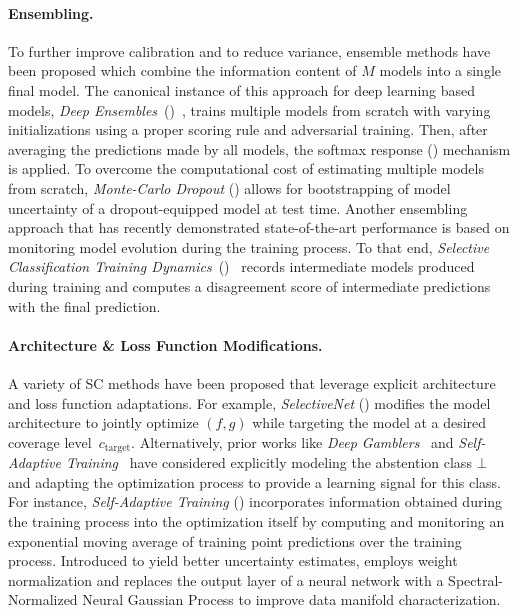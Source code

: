 \paragraph{Ensembling.} %
To further improve calibration and to reduce variance, ensemble methods have been proposed which combine the information content of $M$ models into a single final model. The canonical instance of this approach for deep learning based models, \emph{Deep Ensembles}~(\de)~\citep{lakshminarayanan2017simple}, trains multiple models from scratch with varying initializations using a proper scoring rule and adversarial training. Then, after averaging the predictions made by all models, the softmax response (\sr) mechanism is applied. To overcome the computational cost of estimating multiple models from scratch, \emph{Monte-Carlo Dropout} (\mcdo) \citep{gal2016dropout} allows for bootstrapping of model uncertainty of a dropout-equipped model at test time. Another ensembling approach that has recently demonstrated state-of-the-art \selc performance is based on monitoring model evolution during the training process. To that end, \emph{Selective Classification Training Dynamics}~(\sctd)~\citep{rabanser2022selective} records intermediate models produced during training and computes a disagreement score of intermediate predictions with the final prediction. 


\paragraph{Architecture \& Loss Function Modifications.} 
A variety of SC methods have been proposed that leverage explicit architecture and loss function adaptations. %
For example, \emph{SelectiveNet} (\sn) \citep{geifman2019selectivenet} modifies the model architecture to jointly optimize $(f,g)$ while targeting the model at a desired coverage level~$c_\text{target}$. Alternatively, prior works like \emph{Deep Gamblers}~\citep{liu2019deep} and \emph{Self-Adaptive Training}~\citep{huang2020self} have considered explicitly modeling the abstention class $\bot$ and adapting the optimization process to provide a learning signal for this class. For instance, \emph{Self-Adaptive Training} (\sat) incorporates information obtained during the training process into the optimization itself by computing and monitoring an exponential moving average of training point predictions over the training process. Introduced to yield better uncertainty estimates, \citet{liu2020simple} employs weight normalization and replaces the output layer of a neural network with a Spectral-Normalized Neural Gaussian Process to improve data manifold characterization. 

